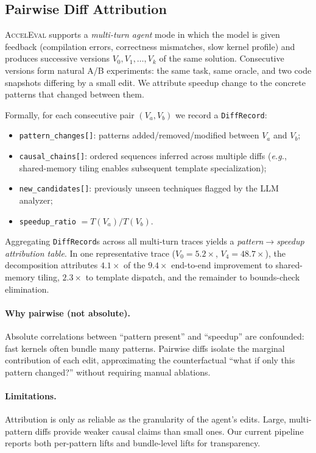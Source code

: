 \documentclass{article}
\begin{document}
\subsection{Pairwise Diff Attribution}
\label{sec:pairwise}

\textsc{AccelEval} supports a \emph{multi-turn agent} mode in which the model is given feedback (compilation errors, correctness mismatches, slow kernel profile) and produces successive versions $V_0, V_1, \ldots, V_k$ of the same solution. Consecutive versions form natural A/B experiments: the same task, same oracle, and two code snapshots differing by a small edit. We attribute speedup change to the concrete patterns that changed between them.

Formally, for each consecutive pair $(V_a, V_b)$ we record a \texttt{DiffRecord}:
\begin{itemize}
  \item \texttt{pattern\_changes[]}: patterns added/removed/modified between $V_a$ and $V_b$;
  \item \texttt{causal\_chains[]}: ordered sequences inferred across multiple diffs (\emph{e.g.}, shared-memory tiling enables subsequent template specialization);
  \item \texttt{new\_candidates[]}: previously unseen techniques flagged by the LLM analyzer;
  \item \texttt{speedup\_ratio} $= T(V_a) / T(V_b)$.
\end{itemize}

Aggregating \texttt{DiffRecord}s across all multi-turn traces yields a \emph{pattern$\to$speedup attribution table}. In one representative trace ($V_0 = 5.2\times$, $V_4 = 48.7\times$), the decomposition attributes $4.1\times$ of the $9.4\times$ end-to-end improvement to shared-memory tiling, $2.3\times$ to template dispatch, and the remainder to bounds-check elimination.

\paragraph{Why pairwise (not absolute).}
Absolute correlations between ``pattern present'' and ``speedup'' are confounded: fast kernels often bundle many patterns. Pairwise diffs isolate the marginal contribution of each edit, approximating the counterfactual ``what if only this pattern changed?'' without requiring manual ablations.

\paragraph{Limitations.}
Attribution is only as reliable as the granularity of the agent's edits. Large, multi-pattern diffs provide weaker causal claims than small ones. Our current pipeline reports both per-pattern lifts and bundle-level lifts for transparency.
\end{document}
